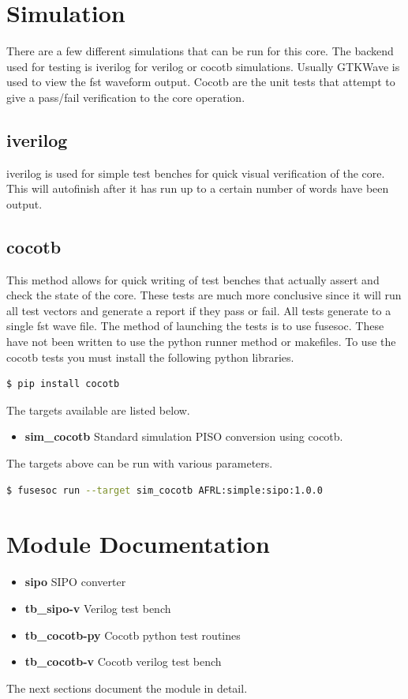 \newpage

\section{Simulation}
\par
There are a few different simulations that can be run for this core. The backend used for testing is iverilog for verilog or cocotb simulations. Usually GTKWave is used to view the fst waveform output. Cocotb are the unit tests that attempt to give a pass/fail verification to the core operation.

\subsection{iverilog}
\par
iverilog is used for simple test benches for quick visual verification of the core. This will autofinish after it has
run up to a certain number of words have been output.

\subsection{cocotb}
\par
This method allows for quick writing of test benches that actually assert and check the state of the core.
These tests are much more conclusive since it will run all test vectors and generate a report if they
pass or fail. All tests generate to a single fst wave file. The method of launching the tests is to use
fusesoc. These have not been written to use the python runner method or makefiles.
To use the cocotb tests you must install the following python libraries.
\begin{lstlisting}[language=bash]
  $ pip install cocotb
\end{lstlisting}

The targets available are listed below.
\begin{itemize}
  \item \textbf{sim\_cocotb} Standard simulation PISO conversion using cocotb.
\end{itemize}

The targets above can be run with various parameters.
\begin{lstlisting}[language=bash]
  $ fusesoc run --target sim_cocotb AFRL:simple:sipo:1.0.0
\end{lstlisting}

\newpage

\section{Module Documentation} \label{Module Documentation}

\par

\begin{itemize}
\item \textbf{sipo} SIPO converter\\
\item \textbf{tb\_sipo-v} Verilog test bench\\
\item \textbf{tb\_cocotb-py} Cocotb python test routines\\
\item \textbf{tb\_cocotb-v} Cocotb verilog test bench\\
\end{itemize}
The next sections document the module in detail.

